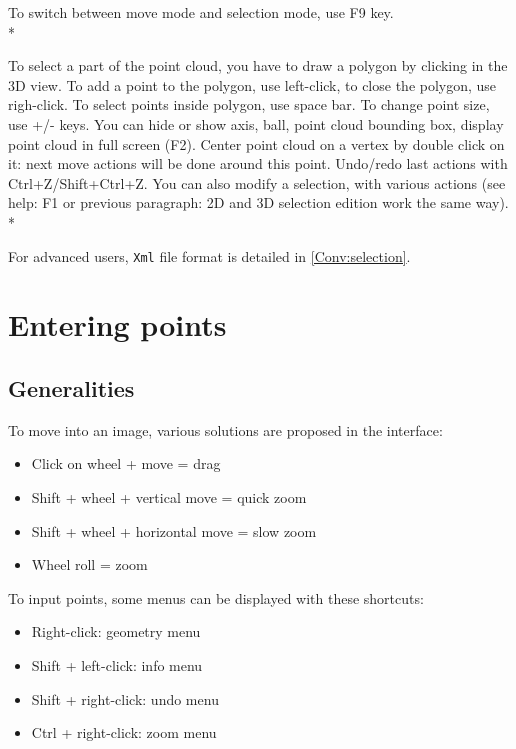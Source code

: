 To switch between move mode and selection mode, use F9 key.\\*

To select a part of the point cloud, you have to draw a polygon by clicking in the 3D view. To add a point to the polygon, use left-click, to close the polygon, use righ-click. To select points inside polygon, use space bar.
To change point size, use +/- keys. You can hide or show axis, ball, point cloud bounding box, display point cloud in full screen (F2).
Center point cloud on a vertex by double click on it: next move actions will be done around this point.
Undo/redo last actions with Ctrl+Z/Shift+Ctrl+Z.
You can also modify a selection, with various actions (see help: F1 or previous paragraph: 2D and 3D selection edition work the same way).\\*

For advanced users, {\tt Xml} file format is detailed in \ref{Conv:selection}.


\section{Entering points}

\subsection{Generalities}


To move into an image, various solutions are proposed in the interface:
\begin{itemize}
\item Click on wheel + move = drag
\item Shift + wheel + vertical move = quick zoom
\item Shift + wheel + horizontal move = slow zoom
\item Wheel roll = zoom
\end{itemize}

\vspace{\baselineskip}
To input points, some menus can be displayed with these shortcuts:
\begin{itemize}
\item Right-click: geometry menu
\item Shift + left-click: info menu
\item Shift + right-click: undo menu
\item Ctrl + right-click: zoom menu
\end{itemize}

